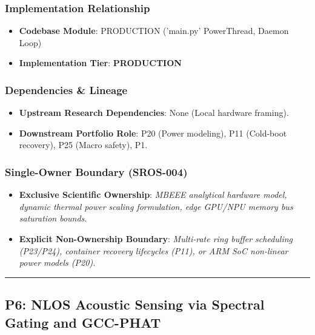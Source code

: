 \documentclass[11pt,letterpaper]{article}
\begin{document}
\subsubsection{Implementation Relationship}
\begin{itemize}[leftmargin=*]
    \item \raggedright \textbf{Codebase Module}: PRODUCTION ('main.py' PowerThread, Daemon Loop)
    \item \textbf{Implementation Tier}: \textbf{PRODUCTION}
\end{itemize}

\subsubsection{Dependencies \& Lineage}
\begin{itemize}[leftmargin=*]
    \item \textbf{Upstream Research Dependencies}: None (Local hardware framing).
    \item \textbf{Downstream Portfolio Role}: P20 (Power modeling), P11 (Cold-\allowbreak boot recovery), P25 (Macro safety), P1.
\end{itemize}

\subsubsection{Single-Owner Boundary (SROS-004)}
\begin{itemize}[leftmargin=*]
    \item \textbf{Exclusive Scientific Ownership}: \textit{MBEEE analytical hardware model, dynamic thermal power scaling formulation, edge GPU/\allowbreak NPU memory bus saturation bounds.}
    \item \textbf{Explicit Non-Ownership Boundary}: \textit{Multi-\allowbreak rate ring buffer scheduling (P23/\allowbreak P24), container recovery lifecycles (P11), or ARM SoC non-\allowbreak linear power models (P20).}
\end{itemize}

\vspace{0.4cm}
\hrule

\subsection{P6: NLOS Acoustic Sensing via Spectral Gating and GCC-\allowbreak PHAT}
\label{sec:profile_p6}
\end{document}

